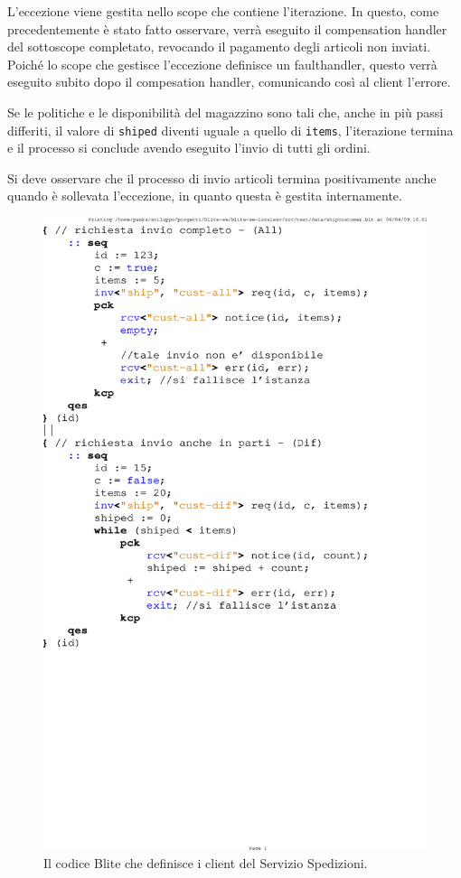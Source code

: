 L'eccezione viene gestita nello scope che contiene l'iterazione. 
In questo, come precedentemente è stato fatto osservare, verrà eseguito 
il compensation handler del sottoscope completato,
revocando il pagamento degli articoli non inviati.
Poiché lo scope che gestisce l'eccezione definisce un
faulthandler, questo verrà eseguito subito dopo il compesation handler,
comunicando così al client l'errore.

Se le politiche e le disponibilità del magazzino sono tali che, anche
in più passi differiti, il valore di \texttt{shiped} diventi uguale a quello di
\texttt{items}, l'iterazione termina e il processo si conclude avendo eseguito
l'invio di tutti gli ordini.

Si deve osservare che il processo di invio articoli termina positivamente anche
quando è sollevata l'eccezione, in quanto questa è gestita internamente.
\\

\begin{figure}[t!]
\begin{center}
  \includegraphics[scale=0.80,clip]{blide/dia/clients}
   \caption[Codice Blite, Clienti del Servizio Spedizioni]{Il codice Blite che
   definisce i client del Servizio Spedizioni.}
  \label{fig:clients}
\end{center}
\end{figure}

